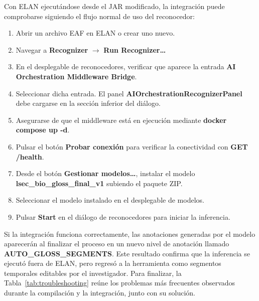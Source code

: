 \documentclass[11pt,a4paper]{article}
\begin{document}
Con ELAN ejecutándose desde el JAR modificado, la integración puede comprobarse siguiendo el flujo normal de uso del reconocedor:

\begin{enumerate}[noitemsep, topsep=2pt, parsep=0pt, partopsep=0pt]
    \item Abrir un archivo EAF en ELAN o crear uno nuevo.
    \item Navegar a \textbf{Recognizer} $\rightarrow$ \textbf{Run Recognizer\ldots}
    \item En el desplegable de reconocedores, verificar que aparece la entrada \textbf{AI Orchestration Middleware Bridge}.
    \item Seleccionar dicha entrada. El panel \textbf{AIOrchestrationRecognizerPanel} debe cargarse en la sección inferior del diálogo.
    \item Asegurarse de que el middleware está en ejecución mediante \textbf{docker compose up -d}.
    \item Pulsar el botón \textbf{Probar conexión} para verificar la conectividad con \textbf{GET /health}.
    \item Desde el botón \textbf{Gestionar modelos\ldots}, instalar el modelo \textbf{lsec\_bio\_gloss\_final\_v1} subiendo el paquete ZIP.
    \item Seleccionar el modelo instalado en el desplegable de modelos.
    \item Pulsar \textbf{Start} en el diálogo de reconocedores para iniciar la inferencia.
\end{enumerate}

Si la integración funciona correctamente, las anotaciones generadas por el modelo aparecerán al finalizar el proceso en un nuevo nivel de anotación llamado \textbf{AUTO\_GLOSS\_SEGMENTS}. Este resultado confirma que la inferencia se ejecutó fuera de ELAN, pero regresó a la herramienta como segmentos temporales editables por el investigador. Para finalizar, la Tabla~\ref{tab:troubleshooting} reúne los problemas más frecuentes observados durante la compilación y la integración, junto con su solución.
\end{document}
